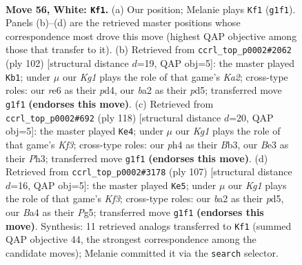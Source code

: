 \documentclass[11pt]{article}
\begin{document}
\clearpage

\begin{figure}[p]\centering
\begin{subfigure}{0.46\textwidth}\centering
\resizebox{\linewidth}{!}{%
\newchessgame
\chessboard[
  setfen={2R5/7k/4r3/8/B3p2p/4Bp1P/b4P2/6K1 w - - 22 56},
  showmover=false,
  pgfstyle=straightmove, color=movearrow, markmove={g1-f1}
]}
\caption{}
\end{subfigure}\hfill
\begin{subfigure}{0.46\textwidth}\centering
\resizebox{\linewidth}{!}{%
\newchessgame
\chessboard[
  setfen={8/3k4/5b2/p2p4/Pp1p4/3B4/KPP5/8 w - - 4 52},
  showmover=false,
  pgfstyle=straightmove, color=movearrow, markmove={a2-b1}
]}
\caption{}
\end{subfigure}
\\[4pt]
\begin{subfigure}{0.46\textwidth}\centering
\resizebox{\linewidth}{!}{%
\newchessgame
\chessboard[
  setfen={3b1k2/8/4Pp2/6p1/6P1/pB3K1P/8/8 w - - 1 60},
  showmover=false,
  pgfstyle=straightmove, color=movearrow, markmove={f3-e4}
]}
\caption{}
\end{subfigure}\hfill
\begin{subfigure}{0.46\textwidth}\centering
\resizebox{\linewidth}{!}{%
\newchessgame
\chessboard[
  setfen={8/2r5/1p3k2/p2P2p1/Pb4B1/3KP3/5P2/R7 b - - 0 54},
  showmover=false,
  pgfstyle=straightmove, color=movearrow, markmove={f6-e5}
]}
\caption{}
\end{subfigure}
\caption{\textbf{Move 56, White: \texttt{Kf1}.} (a) Our position; Melanie plays \texttt{Kf1} (\texttt{g1f1}). Panels (b)--(d) are the retrieved master positions whose correspondence most drove this move (highest QAP objective among those that transfer to it). (b) Retrieved from \texttt{ccrl\_top\_p0002\#2062} (ply 102) [structural distance $d$=19, QAP obj=5]: the master played \texttt{Kb1}; under $\mu$ our \emph{Kg1} plays the role of that game's \emph{Ka2}; cross-type roles: our \emph{r}e6 as their \emph{p}d4, our \emph{b}a2 as their \emph{p}d5; transferred move \texttt{g1f1} \textbf{(endorses this move)}. (c) Retrieved from \texttt{ccrl\_top\_p0002\#692} (ply 118) [structural distance $d$=20, QAP obj=5]: the master played \texttt{Ke4}; under $\mu$ our \emph{Kg1} plays the role of that game's \emph{Kf3}; cross-type roles: our \emph{p}h4 as their \emph{B}b3, our \emph{B}e3 as their \emph{P}h3; transferred move \texttt{g1f1} \textbf{(endorses this move)}. (d) Retrieved from \texttt{ccrl\_top\_p0002\#3178} (ply 107) [structural distance $d$=16, QAP obj=5]: the master played \texttt{Ke5}; under $\mu$ our \emph{Kg1} plays the role of that game's \emph{Kf3}; cross-type roles: our \emph{b}a2 as their \emph{p}d5, our \emph{B}a4 as their \emph{P}g5; transferred move \texttt{g1f1} \textbf{(endorses this move)}. Synthesis: 11 retrieved analogs transferred to \texttt{Kf1} (summed QAP objective 44, the strongest correspondence among the candidate moves); Melanie committed it via the \texttt{search} selector.}
\label{fig:thought-m110}
\end{figure}
\end{document}
